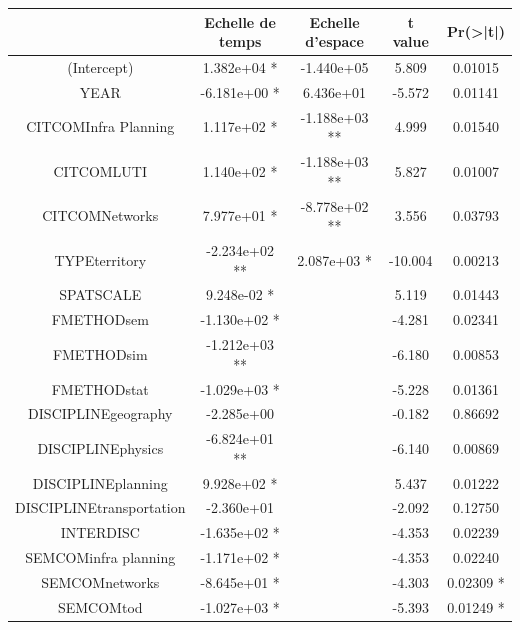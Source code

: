 \begin{table}[h!]
\begin{tabular}{|c|c|c|c|c|}
\hline
 &  Echelle de temps & Echelle d'espace & t value & Pr(>|t|)   \\\hline
(Intercept)           &    1.382e+04 * & -1.440e+05 &  5.809 & 0.01015  \\
YEAR                   &  -6.181e+00 * & 6.436e+01 & -5.572 & 0.01141 \\
CITCOMInfra Planning   &   1.117e+02 * & -1.188e+03 ** &  4.999 & 0.01540 \\
CITCOMLUTI             &   1.140e+02 * & -1.188e+03 **  & 5.827 & 0.01007 \\
CITCOMNetworks         &   7.977e+01 * & -8.778e+02 ** &  3.556 & 0.03793  \\
TYPEterritory          &  -2.234e+02 ** & 2.087e+03 * & -10.004 & 0.00213  \\
SPATSCALE              &   9.248e-02 * &  &  5.119 & 0.01443  \\
FMETHODsem             &  -1.130e+02 * &  &  -4.281 & 0.02341 \\
FMETHODsim             &  -1.212e+03 ** &  & -6.180 & 0.00853\\
FMETHODstat            &  -1.029e+03 * & & -5.228 & 0.01361 \\
DISCIPLINEgeography    &  -2.285e+00 &  & -0.182 & 0.86692   \\
DISCIPLINEphysics      &  -6.824e+01 ** &  & -6.140 & 0.00869 \\
DISCIPLINEplanning     &   9.928e+02 * &  & 5.437 & 0.01222 \\
DISCIPLINEtransportation & -2.360e+01 &  & -2.092 & 0.12750   \\
INTERDISC             &   -1.635e+02 * &  & -4.353 & 0.02239  \\
SEMCOMinfra planning  &   -1.171e+02 * &  & -4.353 & 0.02240 \\
SEMCOMnetworks        &   -8.645e+01 * &  & -4.303 & 0.02309 * \\
SEMCOMtod             &   -1.027e+03 * & & -5.393 & 0.01249 * \\\hline
\end{tabular}
\end{table}

